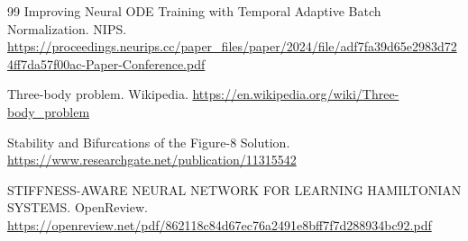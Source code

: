 \begin{thebibliography}{99}
 Improving Neural ODE Training with Temporal Adaptive Batch Normalization. NIPS. \url{https://proceedings.neurips.cc/paper_files/paper/2024/file/adf7fa39d65e2983d724ff7da57f00ac-Paper-Conference.pdf}

 Three-body problem. Wikipedia. \url{https://en.wikipedia.org/wiki/Three-body_problem}

 Stability and Bifurcations of the Figure-8 Solution. \url{https://www.researchgate.net/publication/11315542}

 STIFFNESS-AWARE NEURAL NETWORK FOR LEARNING HAMILTONIAN SYSTEMS. OpenReview. \url{https://openreview.net/pdf/862118c84d67ec76a2491e8bff7f7d288934bc92.pdf}

\end{thebibliography}